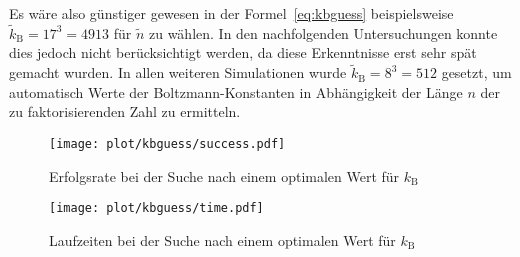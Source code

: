 Es wäre also günstiger gewesen in der Formel~\eqref{eq:kbguess} beispielsweise $\tilde{k}_\mathrm{B}=17^3=4913$ für $\tilde{n}$ zu wählen. In den nachfolgenden Untersuchungen konnte dies jedoch nicht berücksichtigt werden, da diese Erkenntnisse erst sehr spät gemacht wurden. In allen weiteren Simulationen wurde $\tilde{k}_\mathrm{B}=8^3=512$ gesetzt, um automatisch Werte der Boltzmann-Konstanten in Abhängigkeit der Länge $n$ der zu faktorisierenden Zahl zu ermitteln.
\begin{figure}[ht]
		\centering
		\texttt{[image: plot/kbguess/success.pdf]}
		\caption{Erfolgsrate bei der Suche nach einem optimalen Wert für $k_\mathrm{B}$}\label{fig:kbguess-success}
\end{figure}
\begin{figure}[ht]
		\centering
		\texttt{[image: plot/kbguess/time.pdf]}
		\caption{Laufzeiten bei der Suche nach einem optimalen Wert für $k_\mathrm{B}$}\label{fig:kbguess-runtime}
\end{figure}

